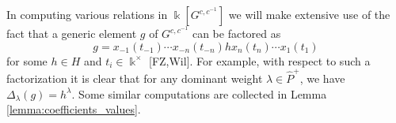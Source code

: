 \documentclass[12pt]{amsart}
\newcommand{\saySS}[1]{\say[SS]{\color{blue}{\bf SS:}\;#1}}
\newcommand{\sayDR}[1]{\say[DR]{\color{red}{\bf DR:}\;#1}}
\newcommand{\kk}{\Bbbk}%
\newtheorem{proposition}[theorem]{Proposition}
\theoremstyle{remark}
\numberwithin{equation}{section}
\begin{document}
In computing various relations in $\kk[G^{c,c^{-1}}]$ we will make extensive use of the fact that a generic element $g$ of $G^{c,c^{-1}}$ can be factored as
\begin{equation}
  \label{eq:generic_element}
  g=x_{-1}(t_{-1}) \cdots x_{-n}(t_{-n}) h x_n(t_n) \cdots x_1(t_1)
\end{equation}
for some $h \in H$ and $t_i \in \kk^\times$ [FZ,Wil]. 
For example, with respect to such a factorization it is clear that for any dominant weight $\lambda \in \widehat{P}^+$, we have $\Delta_\lambda(g) = h^\lambda$. %
Some similar computations are collected in Lemma \ref{lemma:coefficients_values}. 


\end{document}
